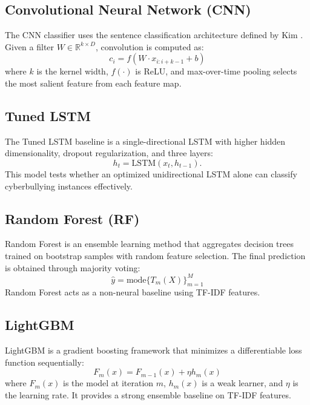 \subsection{Convolutional Neural Network (CNN)}

The CNN classifier uses the sentence classification architecture defined by Kim \cite{ref7}. Given a filter $W \in \mathbb{R}^{k \times D}$, convolution is computed as:
\begin{equation}
c_i = f(W \cdot x_{i:i+k-1} + b)
\end{equation}
where $k$ is the kernel width, $f(\cdot)$ is ReLU, and max-over-time pooling selects the most salient feature from each feature map.

\subsection{Tuned LSTM}

The Tuned LSTM baseline is a single-directional LSTM with higher hidden dimensionality, dropout regularization, and three layers:
\[
h_t = \mathrm{LSTM}(x_t, h_{t-1}).
\]
This model tests whether an optimized unidirectional LSTM alone can classify cyberbullying instances effectively.

\subsection{Random Forest (RF)}

Random Forest \cite{ref5} is an ensemble learning method that aggregates decision trees trained on bootstrap samples with random feature selection. The final prediction is obtained through majority voting:
\begin{equation}
\hat{y} = \mathrm{mode} \{T_m(X)\}_{m=1}^{M}
\end{equation}
Random Forest acts as a non-neural baseline using TF-IDF features.

\subsection{LightGBM}

LightGBM is a gradient boosting framework that minimizes a differentiable loss function sequentially:
\begin{equation}
F_m(x) = F_{m-1}(x) + \eta h_m(x)
\end{equation}
where $F_m(x)$ is the model at iteration $m$, $h_m(x)$ is a weak learner, and $\eta$ is the learning rate. It provides a strong ensemble baseline on TF-IDF features.

